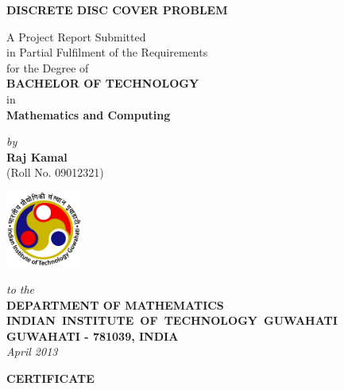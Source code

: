 \documentclass[12pt,a4wide]{report}
\theoremstyle{plain}
\theoremstyle{definition}
\theoremstyle{remark}
\begin{document}






\begin{titlepage}
\enlargethispage{3cm}

\begin{center}

\vspace*{-2cm}

\textbf{\Large DISCRETE DISC COVER PROBLEM}

\vfill

 A Project Report Submitted \\
 in Partial Fulfilment of the Requirements  \\
  for the Degree of  \\[10pt]

 {\Large \bf BACHELOR OF TECHNOLOGY}\\[5pt]
 in \\
 {\large \bf Mathematics and Computing}

 \vfill

{\large \emph{by}}\\[5pt]
{\large\bf {Raj Kamal}}\\[5pt]
{\large (Roll No. 09012321)}

\vfill
\includegraphics[height=2.5cm]{1.png}

\vspace*{0.5cm}

{\em\large to the}\\[10pt]
{\bf\large DEPARTMENT OF MATHEMATICS} \\[5pt]
{\bf\large \mbox{INDIAN INSTITUTE OF TECHNOLOGY GUWAHATI}}\\[5pt]
{\bf\large GUWAHATI - 781039, INDIA}\\[10pt]
{\it\large April 2013}
\end{center}

\end{titlepage}

\clearpage

 \setcounter{page}{2}
\begin{center}
{\Large{\bf{CERTIFICATE}}}
\end{center}
\end{document}
